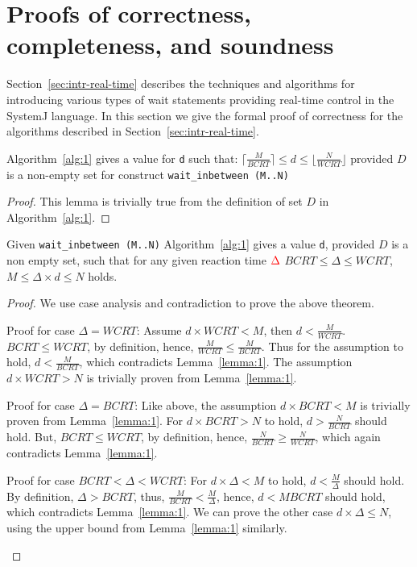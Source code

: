 \section{Proofs of correctness, completeness, and soundness}
\label{sec:proof-correctness}

Section~\ref{sec:intr-real-time} describes the techniques and algorithms
for introducing various types of wait statements providing real-time
control in the SystemJ language. In this section we give the formal
proof of correctness for the algorithms described in
Section~\ref{sec:intr-real-time}.

\begin{lemma}
  Algorithm~\ref{alg:1} gives a value for \texttt{d} such that: $\lceil
  \frac{M}{BCRT} \rceil \leq d \leq \lfloor \frac{N}{WCRT} \rfloor$
  provided $D$ is a non-empty set for construct \texttt{wait\_inbetween
    (M..N)}
\label{lemma:1}
\end{lemma}
\begin{proof}
  This lemma is trivially true from the definition of set $D$ in
  Algorithm~\ref{alg:1}.
\end{proof}

\begin{theorem}
  Given \texttt{wait\_inbetween (M..N)} Algorithm~\ref{alg:1} gives a
  value \texttt{d}, provided $D$ is a non empty set, such that for any
  given reaction time $\textcolor{red}{\Delta}$  $BCRT \leq
  \Delta \leq WCRT$, $M \leq \Delta \times d \leq N$ holds.
\label{th:1}
\end{theorem}
\begin{proof}
  We use case analysis and contradiction to prove the above theorem.
  \begin{compactenum}[\hspace{0.25cm} 1.]
  \item Proof for case $\Delta = WCRT$: Assume \mbox{$d \times WCRT <
      M$}, then $d < \frac{M}{WCRT}$. $BCRT \leq WCRT$, by definition,
    hence, $\frac{M}{WCRT} \leq \frac{M}{BCRT}$. Thus for the assumption
    to hold, $d < \frac{M}{BCRT}$, which contradicts
    Lemma~\ref{lemma:1}. The assumption $d \times WCRT >N$ is trivially
    proven from Lemma~\ref{lemma:1}.
  \item Proof for case $\Delta = BCRT$: Like above, the assumption $d
    \times BCRT < M$ is trivially proven from Lemma~\ref{lemma:1}. For
    $d \times BCRT > N$ to hold, $d > \frac{N}{BCRT}$ should hold. But,
    $BCRT \leq WCRT$, by definition, hence, $\frac{N}{BCRT} \geq
    \frac{N}{WCRT}$, which again contradicts Lemma~\ref{lemma:1}.
  \item Proof for case $BCRT < \Delta < WCRT$: For $d \times \Delta < M$
    to hold, $d < \frac{M}{\Delta}$ should hold. By definition, $\Delta
    > BCRT$, thus, $\frac{M}{BCRT} < \frac{M}{\Delta}$, hence, $d <
    {M}{BCRT}$ should hold, which contradicts Lemma~\ref{lemma:1}. We
    can prove the other case $d \times \Delta \leq N$, using the upper
    bound from Lemma~\ref{lemma:1} similarly.
  \end{compactenum}
\end{proof}

